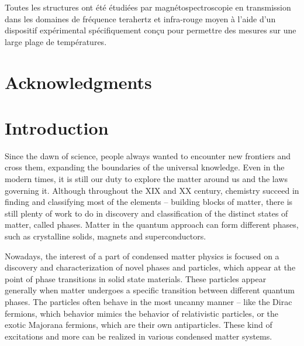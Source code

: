 \documentclass[titlepage,a4paper]{book}
\newcommand{\wciecie}{\quad\phantom{v}}
\begin{document}
Toutes les structures ont été étudiées par magnétospectroscopie en transmission dans les domaines de fréquence terahertz et infra-rouge moyen à l'aide d'un dispositif expérimental spécifiquement conçu pour permettre des mesures sur une large plage de températures.
\chapter*{Acknowledgments}
\wciecie

\clearpage
\tableofcontents


\newpage
\mainmatter
{}
\chapter{Introduction}
\label{chpt:Intro}
\wciecie
Since the dawn of science, people always wanted to encounter new frontiers and cross them, expanding the boundaries of the universal knowledge. Even in the modern times, it is still our duty to explore the matter around us and the laws governing it. Although throughout the XIX and XX century, chemistry succeed in finding and classifying most of the elements -- building blocks of matter, there is still plenty of work to do in discovery and classification of the distinct states of matter, called phases. Matter in the quantum approach can form different phases, such as crystalline solids, magnets and superconductors.  

Nowadays, the interest of a part of condensed matter physics is focused on a discovery and characterization of novel phases and particles, which appear at the point of phase transitions in solid state materials. These particles appear generally when matter undergoes a specific transition between different quantum phases. The particles often behave in the most uncanny manner -- like the Dirac fermions, which behavior mimics the behavior of relativistic particles, or the exotic Majorana fermions, which are their own antiparticles. These kind of excitations and more can be realized in various condensed matter systems. 
\end{document}
